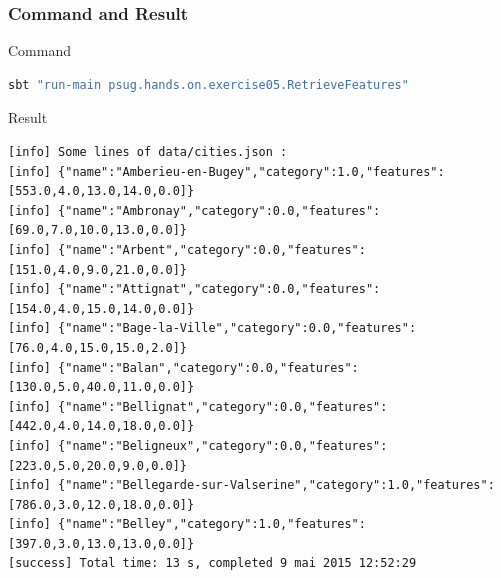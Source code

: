 \documentclass[slidetop,9pt,utf8]{beamer}
\begin{document}
\begin{frame}[fragile]
  \frametitle{Command and Result}

  \begin{block}{Command}
    \begin{lstlisting}[language=bash, style=terminal-medium]
sbt "run-main psug.hands.on.exercise05.RetrieveFeatures"
    \end{lstlisting}
  \end{block}

  \begin{block}{Result}
    \begin{lstlisting}[style=terminal]
[info] Some lines of data/cities.json : 
[info] {"name":"Amberieu-en-Bugey","category":1.0,"features":[553.0,4.0,13.0,14.0,0.0]}
[info] {"name":"Ambronay","category":0.0,"features":[69.0,7.0,10.0,13.0,0.0]}
[info] {"name":"Arbent","category":0.0,"features":[151.0,4.0,9.0,21.0,0.0]}
[info] {"name":"Attignat","category":0.0,"features":[154.0,4.0,15.0,14.0,0.0]}
[info] {"name":"Bage-la-Ville","category":0.0,"features":[76.0,4.0,15.0,15.0,2.0]}
[info] {"name":"Balan","category":0.0,"features":[130.0,5.0,40.0,11.0,0.0]}
[info] {"name":"Bellignat","category":0.0,"features":[442.0,4.0,14.0,18.0,0.0]}
[info] {"name":"Beligneux","category":0.0,"features":[223.0,5.0,20.0,9.0,0.0]}
[info] {"name":"Bellegarde-sur-Valserine","category":1.0,"features":[786.0,3.0,12.0,18.0,0.0]}
[info] {"name":"Belley","category":1.0,"features":[397.0,3.0,13.0,13.0,0.0]}
[success] Total time: 13 s, completed 9 mai 2015 12:52:29
    \end{lstlisting}
  \end{block}

\end{frame}
\end{document}
